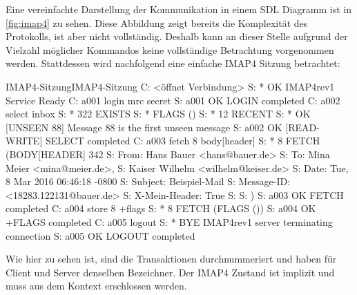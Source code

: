 Eine vereinfachte Darstellung der Kommunikation in einem SDL Diagramm ist in \autoref{fig:imap4} zu sehen. Diese Abbildung zeigt bereits die Komplexität des Protokolls, ist aber nicht vollständig. Deshalb kann an dieser Stelle aufgrund der Vielzahl möglicher Kommandos keine vollständige Betrachtung vorgenommen werden. Stattdessen wird nachfolgend eine einfache IMAP4 Sitzung betrachtet:

\begin{minipage}{\linewidth}
\begin{mail}{IMAP4-Sitzung}{IMAP4-Sitzung}
C: <öffnet Verbindung>
S: * OK IMAP4rev1 Service Ready
C: a001 login mrc secret
S: a001 OK LOGIN completed
C: a002 select inbox
S: * 322 EXISTS
S: * FLAGS (\Answered \Flagged \Deleted \Seen \Draft)
S: * 12 RECENT
S: * OK [UNSEEN 88] Message 88 is the first unseen message
S: a002 OK [READ-WRITE] SELECT completed
C: a003 fetch 8 body[header]
S: * 8 FETCH (BODY[HEADER] {342} 
S: From: Hans Bauer <hans@bauer.de>
S: To: Mina Meier <mina@meier.de>,
S:     Kaiser Wilhelm <wilhelm@keiser.de>
S: Date: Tue, 8 Mar 2016 06:46:18 -0800
S: Subject: Beispiel-Mail
S: Message-ID: <18283.122131@bauer.de>
S: X-Mein-Header: True
S:
S: )
S: a003 OK FETCH completed
C: a004 store 8 +flags \deleted
S: * 8 FETCH (FLAGS (\Seen \Deleted))
S: a004 OK +FLAGS completed
C: a005 logout
S: * BYE IMAP4rev1 server terminating connection
S: a005 OK LOGOUT completed     
\end{mail}
\end{minipage}

Wie hier zu sehen ist, sind die Transaktionen durchnummeriert und haben für Client und Server denselben Bezeichner. Der IMAP4 Zustand ist implizit und muss aus dem Kontext erschlossen werden.

